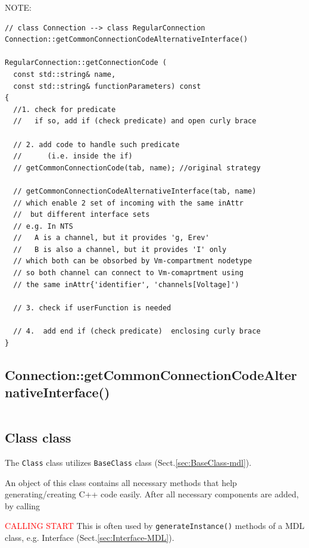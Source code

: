 NOTE:
\begin{lstlisting}
// class Connection --> class RegularConnection
Connection::getCommonConnectionCodeAlternativeInterface()

RegularConnection::getConnectionCode (
  const std::string& name,
  const std::string& functionParameters) const
{
  //1. check for predicate
  //   if so, add if (check predicate) and open curly brace 
  
  // 2. add code to handle such predicate
  //      (i.e. inside the if)
  // getCommonConnectionCode(tab, name); //original strategy
  
  // getCommonConnectionCodeAlternativeInterface(tab, name)
  // which enable 2 set of incoming with the same inAttr
  //  but different interface sets
  // e.g. In NTS
  //   A is a channel, but it provides 'g, Erev'
  //   B is also a channel, but it provides 'I' only
  // which both can be obsorbed by Vm-compartment nodetype
  // so both channel can connect to Vm-comaprtment using
  // the same inAttr{'identifier', 'channels[Voltage]')
  
  // 3. check if userFunction is needed
  
  // 4.  add end if (check predicate)  enclosing curly brace
}
\end{lstlisting}

\subsection{Connection::getCommonConnectionCodeAlternativeInterface()}
\label{sec:Connection::getCommonConnectionCodeAlternativeInterface()}

\begin{verbatim}

\end{verbatim}


\subsection{Class class}
\label{sec:Class-mdl}

The \verb!Class! class utilizes \verb!BaseClass! class (Sect.\ref{sec:BaseClass-mdl}).

An object of this class contains all necessary methods that help generating/creating C++ code easily.
After all necessary components are added, by calling

\textcolor{red}{CALLING START}
This is often used by \verb!generateInstance()! methods of a MDL class, e.g. Interface (Sect.\ref{sec:Interface-MDL}).

